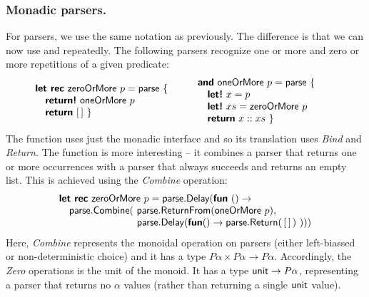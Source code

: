 \documentclass[runningheads,a4paper]{llncs}
\begin{document}
\subsubsection{Monadic parsers.} For parsers, we use the same notation as previously.
The difference is that we can now use  and  repeatedly. The 
following parsers recognize one or more and zero or more repetitions of a given predicate:
%
\begin{equation*}
\hspace{-2em} \begin{array}{l}
\kvd{let rec}~\ident{zeroOrMore}~p = \ident{parse}~\{\\
\quad \kvd{return!}~\ident{oneOrMore}~p\\
\quad \kvd{return}~[\,] ~\}
\end{array}
\qquad
\begin{array}{l}
\kvd{and}~\ident{oneOrMore}~p = \ident{parse}~\{\\
\quad \kvd{let!}~x=p\\
\quad \kvd{let!}~xs = \ident{zeroOrMore}~p\\
\quad \kvd{return}~x::xs ~\}
\end{array}
\end{equation*}
%
The  function uses just the monadic interface and so its translation uses 
\emph{Bind} and \emph{Return}. The  function is more interesting -- it combines
a parser that returns one or more occurrences with a parser that always succeeds and returns an empty 
list. This is achieved using the \emph{Combine} operation:
%
\begin{equation*}
\begin{array}{l}
\kvd{let rec}~\ident{zeroOrMore}~p = \ident{parse}.\ident{Delay}(\kvd{fun}~()\rightarrow \\
\quad \ident{parse}.\ident{Combine}(~\ident{parse}.\ident{ReturnFrom}(\ident{oneOrMore}~p), \\
\hspace{7.8em} \ident{parse}.\ident{Delay}(\kvd{fun} () \rightarrow \ident{parse}.\ident{Return}(\,[\,]\,)~)))
\end{array}
\end{equation*}
%
Here, \emph{Combine} represents the monoidal operation on parsers (either left-biassed or
non-deterministic choice) and it has a type $P\alpha \times P\alpha \rightarrow P\alpha$. Accordingly,
the \emph{Zero} operations is the unit of the monoid. It has a type $\textnormal{\sffamily unit}\rightarrow P\alpha$,
representing a parser that returns no $\alpha$ values (rather than returning a single $\textnormal{\sffamily unit}$ value).
\end{document}
